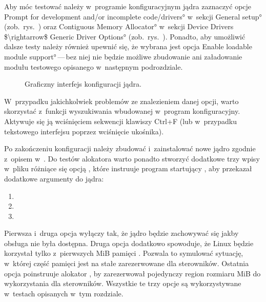 Aby móc testować  należy w~programie konfiguracyjnym jądra
zaznaczyć opcje \ang*{Prompt for development and/or incomplete
  code/drivers} w~sekcji \ang*{General setup}
(zob.\ rys.\ ) oraz \ang*{Contiguous Memory
  Allocator} w~sekcji \ang*{Device Drivers $\rightarrow$ Generic
  Driver Options} (zob.\ rys.\ ).  Ponadto,
aby umożliwić dalsze testy należy również upewnić się, że wybrana jest
opcja \ang*{Enable loadable module support}\,---\,bez niej nie będzie
możliwe zbudowanie ani załadowanie modułu testowego opisanego
w~następnym podrozdziale.

\begin{figure}[tbp]
  \centering
  \vspace{\baselineskip}
  \caption{Graficzny interfejs konfiguracji jądra.}
  \label{fig:xconfig}
\end{figure}

W~przypadku jakichkolwiek problemów ze znalezieniem danej opcji, warto
skorzystać z~funkcji wyszukiwania wbudowanej w~program konfiguracyjny.
Aktywuje się ją wciśnięciem sekwencji klawiszy Ctrl+F (lub w~przypadku
tekstowego interfejsu  poprzez wciśnięcie ukośnika).

Po zakończeniu konfiguracji należy zbudować i~zainstalować nowe jądro
zgodnie z~opisem w~\autocite{bib:building-linux}.  Do testów alokatora
 warto ponadto stworzyć dodatkowe trzy wpisy w~pliku
 różniące się opcją , które
instruuje program startujący , aby przekazał dodatkowe
argumenty do jądra:

\begin{enumerate}
\item {}
\item {}
\item {}
\end{enumerate}

Pierwsza i~druga opcja wyłączy  tak, że jądro będzie
zachowywać się jakby obsługa  nie była dostępna.  Druga opcja
dodatkowo spowoduje, że Linux będzie korzystał tylko z~pierwszych
\unit[512]{MiB} pamięci .  Pozwala to symulować sytuację,
w~której część pamięci jest na stałe zarezerwowane dla sterowników.
Ostatnia opcja poinstruuje alokator , by zarezerwował
pojedynczy region rozmiaru \unit[512]{MiB} do wykorzystania dla
sterowników.  Wszystkie te trzy opcje są wykorzystywane w~testach
opisanych w~tym rozdziale.

